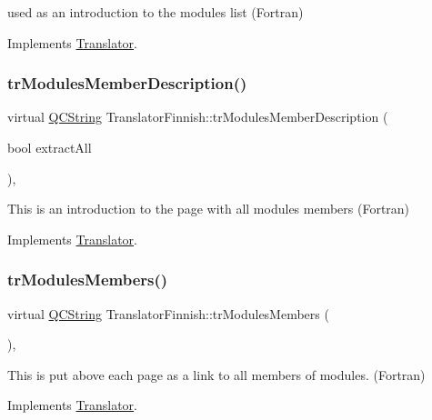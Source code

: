 used as an introduction to the modules list (Fortran) 

Implements \mbox{\hyperlink{class_translator}{Translator}}.

\mbox{\label{class_translator_finnish_a6009c0371fbab4cd9ec84e79e253a12c}} 
\subsubsection{\texorpdfstring{trModulesMemberDescription()}{trModulesMemberDescription()}}
{\footnotesize\ttfamily virtual \mbox{\hyperlink{class_q_c_string}{Q\+C\+String}} Translator\+Finnish\+::tr\+Modules\+Member\+Description (\begin{DoxyParamCaption}\item[{bool}]{extract\+All }\end{DoxyParamCaption})\hspace{0.3cm}{\ttfamily [inline]}, {\ttfamily [virtual]}}

This is an introduction to the page with all modules members (Fortran) 

Implements \mbox{\hyperlink{class_translator}{Translator}}.

\mbox{\label{class_translator_finnish_a60dbf6ec84b76df710f225bce1e35094}} 
\subsubsection{\texorpdfstring{trModulesMembers()}{trModulesMembers()}}
{\footnotesize\ttfamily virtual \mbox{\hyperlink{class_q_c_string}{Q\+C\+String}} Translator\+Finnish\+::tr\+Modules\+Members (\begin{DoxyParamCaption}{ }\end{DoxyParamCaption})\hspace{0.3cm}{\ttfamily [inline]}, {\ttfamily [virtual]}}

This is put above each page as a link to all members of modules. (Fortran) 

Implements \mbox{\hyperlink{class_translator}{Translator}}.

